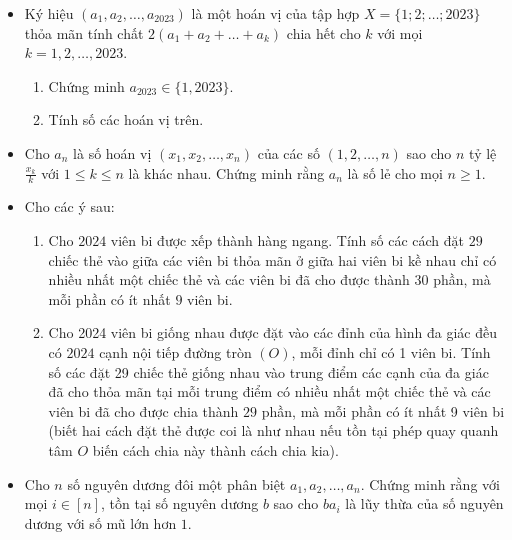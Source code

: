 \documentclass[11pt]{scrartcl}
\begin{document}
\begin{itemize}[label=, leftmargin=0em, itemsep=-0em]
\begin{btvn}
    \end{btvn}
    \item \begin{btvn} Ký hiệu $(a_1, a_2, \ldots, a_{2023})$ là một hoán vị của tập hợp $X = \{1; 2; \ldots; 2023\}$ thỏa mãn tính chất $2(a_1 + a_2 + \ldots + a_k)$ chia hết cho $k$ với mọi $k = 1, 2, \ldots, 2023$.
        \begin{enumerate}
            \item Chứng minh $a_{2023} \in \{1, 2023\}$.
            \item Tính số các hoán vị trên.
        \end{enumerate}
    \end{btvn}
    \item \begin{btvn}
        Cho $a_n$ là số hoán vị $(x_1, x_2, \dots, x_n)$ của các số $(1,2,\dots, n)$ sao cho $n$ tỷ lệ $\frac{x_k}{k}$ với $1\le k\le n$ là khác nhau. Chứng minh rằng $a_n$ là số lẻ cho mọi $n\ge 1$.
    \end{btvn}
    \item \begin{btvn}
        Cho các ý sau:
        \begin{enumerate}[label=(\alph*)]
            \item Cho $2024$ viên bi được xếp thành hàng ngang. Tính số các cách đặt $29$ chiếc thẻ vào giữa các viên bi thỏa mãn ở giữa hai viên bi kề nhau chỉ có nhiều nhất một chiếc thẻ và các viên bi đã cho được thành $30$ phần, mà mỗi phần có ít nhất $9$ viên bi.
            \item Cho 2024 viên bi giống nhau được đặt vào các đỉnh của hình đa giác đều có $2024$ cạnh nội tiếp đường tròn $(O)$, mỗi đỉnh chỉ có 1 viên bi. Tính số các đặt 29 chiếc thẻ giống nhau vào trung điểm các cạnh của đa giác đã cho thỏa mãn tại mỗi trung điểm có nhiều nhất một chiếc thẻ và các viên bi đã cho được chia thành $29$ phần, mà mỗi phần có ít nhất 9 viên bi (biết hai cách đặt thẻ được coi là như nhau nếu tồn tại phép quay quanh tâm $O$ biến cách chia này thành cách chia kia).
        \end{enumerate}
    \end{btvn}
    \item \begin{btvn}
        Cho $n$ số nguyên dương đôi một phân biệt $a_1,a_2,\dots,a_n$. Chứng minh rằng với mọi $i \in [n]$, tồn tại số nguyên dương $b$ sao cho $ba_i$ là lũy thừa của số nguyên dương với số mũ lớn hơn $1$.

\end{btvn}
\end{itemize}
\end{document}
